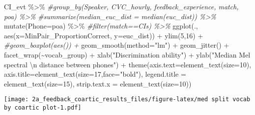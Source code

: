 \documentclass[
]{article}
\newenvironment{Shaded}{\begin{snugshade}}{\end{snugshade}}
\newcommand{\AttributeTok}[1]{\textcolor[rgb]{0.77,0.63,0.00}{#1}}
\newcommand{\CommentTok}[1]{\textcolor[rgb]{0.56,0.35,0.01}{\textit{#1}}}
\newcommand{\DecValTok}[1]{\textcolor[rgb]{0.00,0.00,0.81}{#1}}
\newcommand{\FunctionTok}[1]{\textcolor[rgb]{0.00,0.00,0.00}{#1}}
\newcommand{\NormalTok}[1]{#1}
\newcommand{\SpecialCharTok}[1]{\textcolor[rgb]{0.00,0.00,0.00}{#1}}
\newcommand{\StringTok}[1]{\textcolor[rgb]{0.31,0.60,0.02}{#1}}
\begin{document}
\begin{Shaded}
\begin{Highlighting}[]
\NormalTok{ CI\_evt }\SpecialCharTok{\%\textgreater{}\%}
  \CommentTok{\#group\_by(Speaker, CVC\_hourly, feedback\_experience, match, poa) \%\textgreater{}\%}
  \CommentTok{\#summarize(median\_euc\_dist = median(euc\_dist)) \%\textgreater{}\%}
  \FunctionTok{mutate}\NormalTok{(}\AttributeTok{Phone=}\NormalTok{poa) }\SpecialCharTok{\%\textgreater{}\%}
  \CommentTok{\#filter(match==\textquotesingle{}CIs\textquotesingle{}) \%\textgreater{}\%}
  \FunctionTok{ggplot}\NormalTok{(., }\FunctionTok{aes}\NormalTok{(}\AttributeTok{x=}\NormalTok{MinPair\_ProportionCorrect, }\AttributeTok{y=}\NormalTok{euc\_dist)) }\SpecialCharTok{+} 
  \FunctionTok{ylim}\NormalTok{(}\DecValTok{5}\NormalTok{,}\DecValTok{16}\NormalTok{) }\SpecialCharTok{+} 
  \CommentTok{\#geom\_boxplot(aes()) + }
  \FunctionTok{geom\_smooth}\NormalTok{(}\AttributeTok{method=}\StringTok{"lm"}\NormalTok{) }\SpecialCharTok{+} 
   \FunctionTok{geom\_jitter}\NormalTok{() }\SpecialCharTok{+}
  \FunctionTok{facet\_wrap}\NormalTok{(}\SpecialCharTok{\textasciitilde{}}\NormalTok{vocab\_group) }\SpecialCharTok{+}
  \FunctionTok{xlab}\NormalTok{(}\StringTok{"Discrimination ability"}\NormalTok{) }\SpecialCharTok{+} 
  \FunctionTok{ylab}\NormalTok{(}\StringTok{"Median Mel spectral }\SpecialCharTok{\textbackslash{}n}\StringTok{ distance between phones"}\NormalTok{) }\SpecialCharTok{+} 
  \FunctionTok{theme}\NormalTok{(}\AttributeTok{axis.text=}\FunctionTok{element\_text}\NormalTok{(}\AttributeTok{size=}\DecValTok{10}\NormalTok{),}
      \AttributeTok{axis.title=}\FunctionTok{element\_text}\NormalTok{(}\AttributeTok{size=}\DecValTok{17}\NormalTok{,}\AttributeTok{face=}\StringTok{"bold"}\NormalTok{),}
      \AttributeTok{legend.title =} \FunctionTok{element\_text}\NormalTok{(}\AttributeTok{size=}\DecValTok{15}\NormalTok{),}
      \AttributeTok{strip.text.x =} \FunctionTok{element\_text}\NormalTok{(}\AttributeTok{size=}\DecValTok{10}\NormalTok{)) }
\end{Highlighting}
\end{Shaded}

\texttt{[image: 2a\_feedback\_coartic\_results\_files/figure-latex/med split vocab by coartic plot-1.pdf]}
\end{document}
